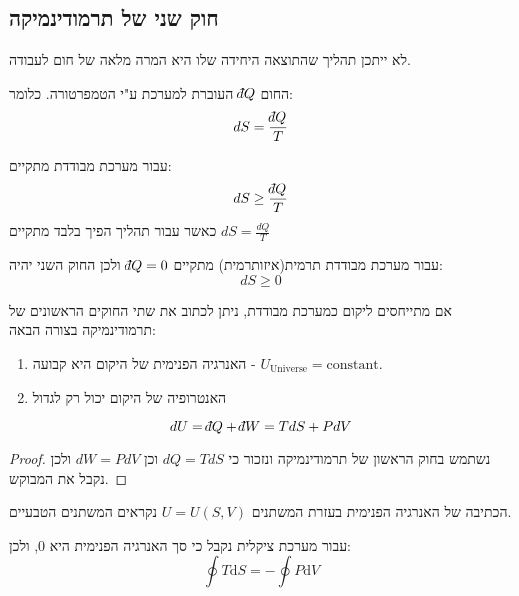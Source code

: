 \documentclass{tstextbook}
\begin{document}
\subsection{חוק שני של תרמודינמיקה}

\begin{theorem}
לא ייתכן תהליך שהתוצאה היחידה שלו היא המרה מלאה של חום לעבודה.

\end{theorem}
\begin{definition}[אנטרופיה]
החום \(\;\bar{}\mkern-7.5mu dQ\) העוברת למערכת ע"י הטמפרטורה. כלומר:
$$dS = \frac{\;\bar{}\mkern-7.5mu dQ}{T}$$

\end{definition}
\begin{proposition}
עבור מערכת מבודדת מתקיים:
$$dS \geq \frac{\;\bar{}\mkern-7.5mu dQ}{T}$$
כאשר עבור תהליך הפיך בלבד מתקיים \(dS = \frac{dQ}{T}\)

\end{proposition}
\begin{corollary}
עבור מערכת מבודדת תרמית(איזותרמית) מתקיים \(\;\bar{}\mkern-7.5mu dQ=0\) ולכן החוק השני יהיה:
$$dS \geq 0$$

\end{corollary}
\begin{corollary}
אם מתייחסים ליקום כמערכת מבודדת, ניתן לכתוב את שתי החוקים הראשונים של תרמודינמיקה בצורה הבאה:

  \begin{enumerate}
    \item האנרגיה הפנימית של היקום היא קבועה - \(U_{\mathrm{Universe}}=\mathrm{constant}.\)


    \item האנטרופיה של היקום יכול רק לגדול 


  \end{enumerate}
\end{corollary}
\begin{proposition}
$$dU=\;\bar{}\mkern-7.5mu dQ+\;\bar{}\mkern-7.5mu dW=TdS + PdV$$

\end{proposition}
\begin{proof}
נשתמש בחוק הראשון של תרמודינמיקה ונזכור כי \(dQ = TdS\) וכן \(dW = PdV\) ולכן נקבל את המבוקש.

\end{proof}
\begin{remark}
הכתיבה של האנרגיה הפנימית בעזרת המשתנים \(U=U(S,V)\) נקראים המשתנים הטבעיים. 

\end{remark}
\begin{proposition}
עבור מערכת ציקלית נקבל כי סך האנרגיה הפנימית היא 0, ולכן:
$$\oint T\mathrm{d}S = - \oint P \mathrm{d}V$$

\end{proposition}
\end{document}
